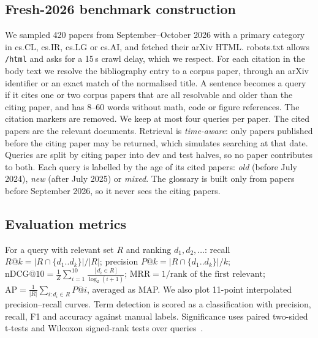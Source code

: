 \documentclass[10pt,twocolumn]{article}
\begin{document}
\subsection{Fresh-2026 benchmark construction}
We sampled 420 papers from September--October 2026 with a primary category in
cs.CL, cs.IR, cs.LG or cs.AI, and fetched their arXiv HTML. robots.txt allows
\texttt{/html} and asks for a 15\,s crawl delay, which we respect. For each citation
in the body text we resolve the bibliography entry to a corpus paper, through an
arXiv identifier or an exact match of the normalised title. A sentence becomes a
query if it cites one or two corpus papers that are all resolvable and older than
the citing paper, and has 8--60 words without math, code or figure references. The
citation markers are removed. We keep at most four queries per paper. The
cited papers are the relevant documents. Retrieval is \emph{time-aware}: only papers
published before the citing paper may be returned, which simulates searching at that
date. Queries are split by citing paper into dev and test halves, so no paper
contributes to both. Each query is labelled by the age of its cited papers:
\emph{old} (before July 2024), \emph{new} (after July 2025) or \emph{mixed}. The
glossary is built only from papers before September 2026, so it never sees the
citing papers.

\subsection{Evaluation metrics}
For a query with relevant set $R$ and ranking $d_1,d_2,\dots$:
recall $R@k=|R\cap\{d_1..d_k\}|/|R|$; precision $P@k=|R\cap\{d_1..d_k\}|/k$;
$\mathrm{nDCG@10}=\frac{1}{Z}\sum_{i=1}^{10}\frac{[d_i\in R]}{\log_2(i+1)}$;
$\mathrm{MRR}=1/\text{rank of the first relevant}$;
$\mathrm{AP}=\frac{1}{|R|}\sum_{i:d_i\in R}P@i$, averaged as MAP. We also plot 11-point
interpolated precision--recall curves. Term detection is scored as a classification
with precision, recall, F1 and accuracy against manual labels. Significance uses
paired two-sided t-tests and Wilcoxon signed-rank tests over queries~\cite{smucker2007}.


\end{document}
